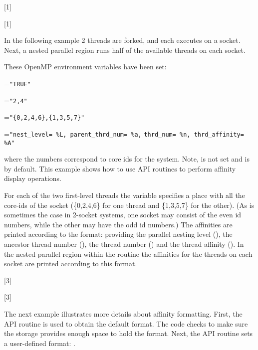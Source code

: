 [1]

[1]


In the following example 2 threads are forked, and each executes on a socket. Next,
a nested parallel region runs half of the available threads on each socket.

These OpenMP environment variables have been set:

\begin{compactitem}
\item {}=\verb+"TRUE"+
\item {}=\verb+"2,4"+
\item {}=\verb+"{0,2,4,6},{1,3,5,7}"+
\item {}=\verb+"nest_level= %L, parent_thrd_num= %a,+ \verb+thrd_num= %n, thrd_affinity= %A"+
\end{compactitem}

where the numbers correspond to core ids for the system. Note,  is not
set and is  by default.  This example shows how to use API routines to
perform affinity display operations.

For each of the two first-level threads the  variable specifies
a place with all the core-ids of the socket (\{0,2,4,6\} for one thread and \{1,3,5,7\} for the other).
(As is sometimes the case in 2-socket systems, one socket may consist
of the even id numbers, while the other may have the odd id numbers.)  The affinities
are printed according to the  format: providing
the parallel nesting level (), the ancestor thread number (), the thread number ()
and the thread affinity (). In the nested parallel region within the  routine
the affinities for the threads on each socket are printed according to this format.

[3]

[3]

{}
The next example illustrates more details about affinity formatting.
First, the  API routine is used to 
obtain the default format. The code checks to make sure the storage 
provides enough space to hold the format.  
Next, the  API routine sets a user-defined 
format: .   

